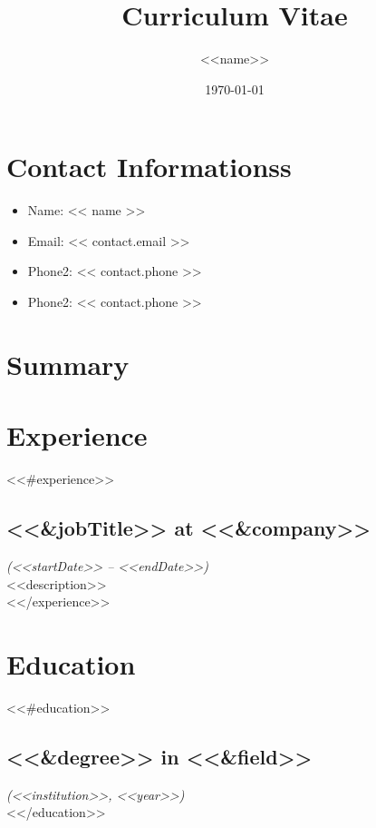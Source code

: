 \documentclass{article}
\title{Curriculum Vitae}
\author{<<name>>}
\date{\today}
\begin{document}
\maketitle

\section*{Contact Informationss}
\begin{itemize}
    \item Name: << name >>  %
    \item Email: << contact.email >>  %
    \item Phone2: << contact.phone >>   %
    \item Phone2: << contact.phone >>   %
\end{itemize}

\section*{Summary}


\section*{Experience}
<<#experience>>
\subsection*{<<&jobTitle>> at <<&company>>}
\textit{(<<startDate>> -- <<endDate>>)}\\
<<description>>\\
<</experience>>

\section*{Education}
<<#education>>
\subsection*{<<&degree>> in <<&field>>}
\textit{(<<institution>>, <<year>>)}\\
<</education>>
\end{document}
